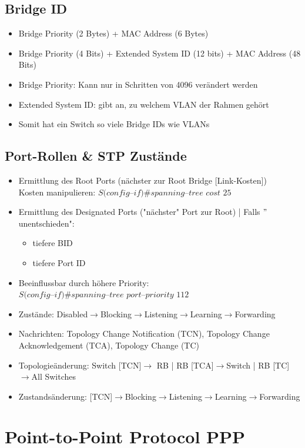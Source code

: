 \documentclass[landscape,twocolumn,a4paper]{article}
\newcommand{\ra}{\rightarrow}
\begin{document}
\begin{footnotesize}
\subsection{Bridge ID}
\begin{itemize}
	\item Bridge Priority (2 Bytes) + MAC Address (6 Bytes)
	\item Bridge Priority (4 Bits) + Extended System ID (12 bits) + MAC Address (48 Bits)
	\item Bridge Priority: Kann nur in Schritten von 4096 verändert werden
	\item Extended System ID: gibt an, zu welchem VLAN der Rahmen gehört
	\item Somit hat ein Switch so viele Bridge IDs wie VLANs
\end{itemize}

\subsection{Port-Rollen \& STP Zustände}
\begin{itemize}
	\item Ermittlung des Root Ports (nächster zur Root Bridge [Link-Kosten])\\
	Kosten manipulieren: $S(config$--$if)\#spanning$--$tree$ $cost$ $25$
	\item Ermittlung des Designated Ports ("nächster" Port zur Root) | Falls $"$unentschieden":
	\begin{itemize}
		\item tiefere BID
		\item tiefere Port ID
	\end{itemize}
	\item Beeinflussbar durch höhere Priority:\\
	$S(config$--$if)\#spanning$--$tree$ $port$--$priority$ $112$
	\item Zustände: Disabled$\ra$Blocking$\ra$Listening$\ra$Learning$\ra$Forwarding
	\item Nachrichten: Topology Change Notification (TCN), Topology Change Acknowledgement (TCA), Topology Change (TC)
	\item Topologieänderung: Switch [TCN]$\ra$ RB | RB [TCA]$\ra$Switch | RB [TC]$\ra$All Switches
	\item Zustandsänderung: [TCN]$\ra$Blocking$\ra$Listening$\ra$Learning$\ra$Forwarding
\end{itemize}

\section{Point-to-Point Protocol PPP}

\end{footnotesize}
\end{document}
